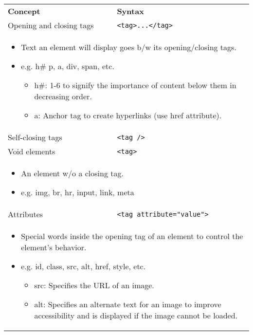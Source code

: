 \begin{summary}
    \begin{center}
        \begin{tabular}{ll}
            \textbf{Concept} & \textbf{Syntax} \\ 
            Opening and closing tags & \texttt{<tag>...</tag>} \\
            \multicolumn{2}{p{\linewidth}}{\begin{itemize}
                \item Text an element will display goes b/w its opening/closing tags. 
                \item e.g. h\# p, a, div, span, etc.
                \begin{itemize}
                    \item h\#: 1-6 to signify the importance of content below them in decreasing order.
                    \item a: Anchor tag to create hyperlinks (use href attribute).
                \end{itemize}
            \end{itemize}} \\
            Self-closing tags & \texttt{<tag />} \\
            Void elements & \texttt{<tag>} \\
            \multicolumn{2}{p{\linewidth}}{\begin{itemize}
                \item An element w/o a closing tag.
                \item e.g. img, br, hr, input, link, meta
            \end{itemize}} \\
            Attributes & \texttt{<tag attribute="value">} \\
            \multicolumn{2}{p{\linewidth}}{\begin{itemize}
                \item Special words inside the opening tag of an element to control the element's behavior.
                \item e.g. id, class, src, alt, href, style, etc.
                \begin{itemize}
                    \item src: Specifies the URL of an image.
                    \item alt: Specifies an alternate text for an image to improve accessibility and is displayed if the image cannot be loaded.

\end{itemize}
\end{itemize}}
\end{tabular}
\end{center}
\end{summary}
